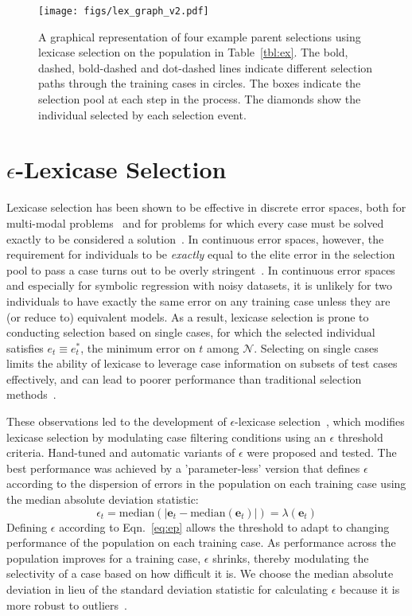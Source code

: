 \documentclass[twoside]{article}
\begin{document}
\begin{figure}[tb]
\centering
  \texttt{[image: figs/lex\_graph\_v2.pdf]}
  \caption{A graphical representation of four example parent selections using lexicase selection on the population in Table~\ref{tbl:ex}. The bold, dashed, bold-dashed and dot-dashed lines indicate different selection paths through the training cases in circles. The boxes indicate the selection pool at each step in the process. The diamonds show the individual selected by each selection event.}\label{fig:lex_graph}
\end{figure}

\section{{\large $\epsilon$}-Lexicase Selection}\label{s:eplex}

Lexicase selection has been shown to be effective in discrete error spaces, both for multi-modal problems~\citep{spector_assessment_2012} and for problems for which every case must be solved exactly to be considered a solution~\citep{helmuth_solving_2014, helmuth_general_2015-1}. In continuous error spaces, however, the requirement for individuals to be {\it exactly} equal to the elite error in the selection pool to pass a case turns out to be overly stringent~\citep{la_cava_epsilon-lexicase_2016}. In continuous error spaces and especially for symbolic regression with noisy datasets, it is unlikely for two individuals to have exactly the same error on any training case unless they are (or reduce to) equivalent models. As a result, lexicase selection is prone to conducting selection based on single cases, for which the selected individual satisfies $e_t \equiv e^*_t$, the minimum error on $t$ among $\mathcal{N}$. Selecting on single cases limits the ability of lexicase to leverage case information on subsets of test cases effectively, and can lead to poorer performance than traditional selection methods~\citep{la_cava_epsilon-lexicase_2016}. 

These observations led to the development of $\epsilon$-lexicase selection~\citep{la_cava_epsilon-lexicase_2016}, which modifies lexicase selection by modulating case filtering conditions using an $\epsilon$ threshold criteria. Hand-tuned and automatic variants of $\epsilon$ were proposed and tested. The best performance was achieved by a 'parameter-less' version that defines $\epsilon$ according to the dispersion of errors in the population on each training case using the median absolute deviation statistic:  
\begin{equation}\label{eq:ep}
\epsilon_t = \text{median}(|\mathbf{e}_t - \text{median}(\mathbf{e}_t)|) = \lambda(\mathbf{e}_t)
\end{equation}
Defining $\epsilon$ according to Eqn.~\ref{eq:ep} allows the threshold to adapt to changing performance of the population on each training case. As performance across the population improves for a training case, $\epsilon$ shrinks, thereby modulating the selectivity of a case based on how difficult it is. We choose the median absolute deviation in lieu of the standard deviation statistic for calculating $\epsilon$ because it is more robust to outliers~\citep{pham-gia_mean_2001}. 
\end{document}

